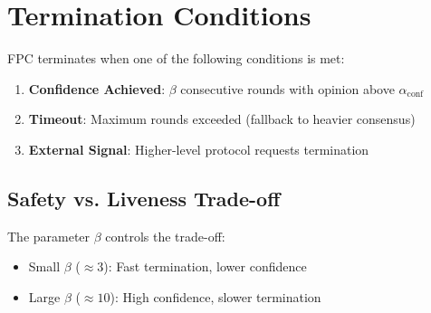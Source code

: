 \section{Termination Conditions}

\label{sec:termination}

FPC terminates when one of the following conditions is met:

\begin{enumerate}
\item \textbf{Confidence Achieved}: $\beta$ consecutive rounds with opinion above $\alpha_{\text{conf}}$
\item \textbf{Timeout}: Maximum rounds exceeded (fallback to heavier consensus)
\item \textbf{External Signal}: Higher-level protocol requests termination
\end{enumerate}

\subsection{Safety vs. Liveness Trade-off}

The parameter $\beta$ controls the trade-off:
\begin{itemize}
\item Small $\beta$ ($\approx 3$): Fast termination, lower confidence
\item Large $\beta$ ($\approx 10$): High confidence, slower termination
\end{itemize}

